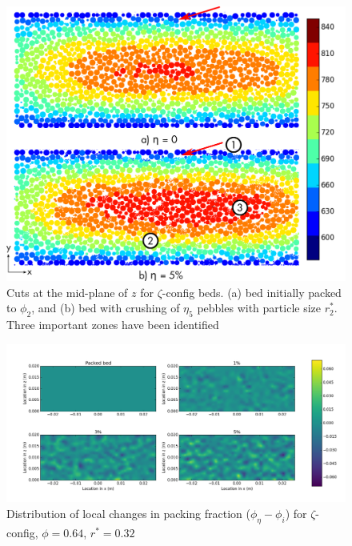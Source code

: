 \documentclass[11pt]{report} %
\begin{document}
\begin{figure}[!t]
    \centering
    \includegraphics[width = \textwidth]{images/z-64-discrete.png}
    \caption{Cuts at the mid-plane of $z$ for $\zeta$-config beds. (a) bed initially packed to $\phi_2$, and (b) bed with crushing of $\eta_5$ pebbles with particle size $r_2^*$. Three important zones have been identified}\label{fig:z-pebbles}
\end{figure}
\begin{figure}[!t]
    \centering
    \includegraphics[width = \textwidth]{images/z-62-r23-1-deltas.png}
    \caption{Distribution of local changes in packing fraction ($\phi_{\eta} - \phi_i$) for $\zeta$-config, $\phi = 0.64$, $r^* = 0.32$}\label{fig:z-64-r23-deltas}
\end{figure}
\end{document}
